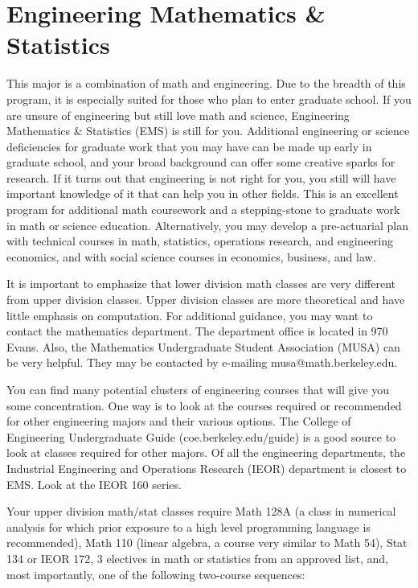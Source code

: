 \chapter*{Engineering Mathematics \& Statistics}

This major is a combination of math and engineering. Due to the breadth of this program, it is especially suited for those who plan to enter graduate school. If you are unsure of engineering but still love math and science, Engineering Mathematics \& Statistics (EMS) is still for you. Additional engineering or science deficiencies for graduate work that you may have can be made up early in graduate school, and your broad background can offer some creative sparks for research. If it turns out that engineering is not right for you, you still will have important knowledge of it that can help you in other fields. This is an excellent program for additional math coursework and a stepping-stone to graduate work in math or science education. Alternatively, you may develop a pre-actuarial plan with technical courses in math, statistics, operations research, and engineering economics, and with social science courses in economics, business, and law.

It is important to emphasize that lower division math classes are very different from upper division classes. Upper division classes are more theoretical and have little emphasis on computation. For additional guidance, you may want to contact the mathematics department. The department office is located in 970 Evans. Also, the Mathematics Undergraduate Student Association (MUSA) can be very helpful. They may be contacted by e-mailing {\selectfont musa@math.berkeley.edu}.

You can find many potential clusters of engineering courses that will give you some concentration. One way is to look at the courses required or recommended for other engineering majors and their various options. The College of Engineering Undergraduate Guide ({\selectfont coe.berkeley.edu/guide}) is a good source to look at classes required for other majors. Of all the engineering departments, the Industrial Engineering and Operations Research (IEOR) department is closest to EMS. Look at the IEOR 160 series.

Your upper division math/stat classes require Math 128A (a class in numerical analysis for which prior exposure to a high level programming language is recommended), Math 110 (linear algebra, a course very similar to Math 54), Stat 134 or IEOR 172, 3 electives in math or 
statistics from an approved list, and, most importantly, one of the following two-course sequences:

